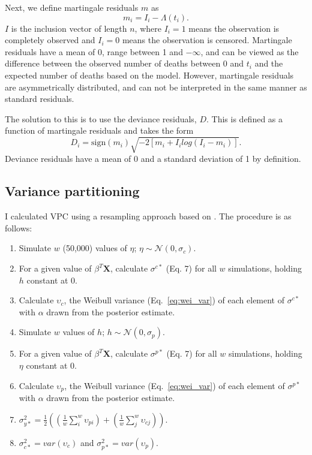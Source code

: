 Next, we define martingale residuals \(m\) as
\begin{equation*}
  m_{i} = I_{i} - \Lambda(t_i).
\end{equation*}
\(I\) is the inclusion vector of length \(n\), where \(I_{i} = 1\) means the observation is completely observed and \(I_{i} = 0\) means the observation is censored. Martingale residuals have a mean of 0, range between 1 and \(-\infty\), and can be viewed as the difference between the observed number of deaths between 0 and \(t_{i}\) and the expected number of deaths based on the model. However, martingale residuals are asymmetrically distributed, and can not be interpreted in the same manner as standard residuals. 

The solution to this is to use the deviance residuals, \(D\). This is defined as a function of martingale residuals and takes the form
\begin{equation*}
  D_{i} = \text{sign}(m_{i}) \sqrt{-2[m_{i} + I_{i}log(I_{i} - m_{i})]}.
\end{equation*}
Deviance residuals have a mean of 0 and a standard deviation of 1 by definition.

\subsection{Variance partitioning}
I calculated VPC using a resampling approach based on \cite{Goldstein2002}. The procedure is as follows:
\begin{enumerate}
  \item Simulate \(w\) (50,000) values of \(\eta\); \(\eta \sim \mathcal{N}(0, \sigma_{c})\).
  \item For a given value of \(\beta^{T} \mathbf{X}\), calculate \(\sigma^{c*}\) (Eq. 7) for all \(w\) simulations, holding \(h\) constant at 0.
  \item Calculate \(\upsilon_{c}\), the Weibull variance (Eq.~\ref{eq:wei_var}) of each element of \(\sigma^{c*}\) with \(\alpha\) drawn from the posterior estimate.
  \item Simulate \(w\) values of \(h\); \(h \sim \mathcal{N}(0, \sigma_{p})\). 
  \item For a given value of \(\beta^{T} \mathbf{X}\), calculate \(\sigma^{p*}\) (Eq. 7) for all \(w\) simulations, holding \(\eta\) constant at 0.
  \item Calculate \(\upsilon_{p}\), the Weibull variance (Eq.~\ref{eq:wei_var}) of each element of \(\sigma^{p*}\) with \(\alpha\) drawn from the posterior estimate.
  \item \(\sigma_{y*}^{2} = \frac{1}{2} \left(\left(\frac{1}{w} \sum_{i}^{w} \upsilon_{pi}\right) + \left(\frac{1}{w} \sum_{j}^{w} \upsilon_{cj}\right)\right)\).
  \item \(\sigma_{c*}^{2} = var(\upsilon_{c})\) and \(\sigma_{p*}^{2} = var(\upsilon_{p})\).
\end{enumerate}

